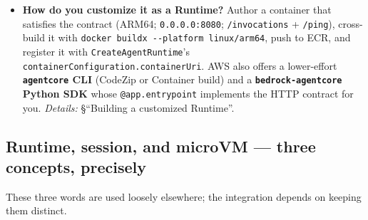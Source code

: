 \documentclass[
  paper=a4,
  ,captions=tableheading
]{scrartcl}
\begin{document}
\begin{itemize}
  and §``Can AgentCore host every frontier sandbox?''.
\item
  \textbf{How do you customize it as a Runtime?} Author a container that
  satisfies the contract (ARM64; \texttt{0.0.0.0:8080};
  \texttt{/invocations} + \texttt{/ping}), cross-build it with
  \texttt{docker\ buildx\ -\/-platform\ linux/arm64}, push to ECR, and
  register it with \texttt{CreateAgentRuntime}'s
  \texttt{containerConfiguration.containerUri}. AWS also offers a
  lower-effort \textbf{\texttt{agentcore} CLI} (CodeZip or Container
  build) and a \textbf{\texttt{bedrock-agentcore} Python SDK} whose
  \texttt{@app.entrypoint} implements the HTTP contract for you.
  \emph{Details:} §``Building a customized Runtime''.
\end{itemize}

\hypertarget{runtime-session-and-microvm-three-concepts-precisely}{%
\subsection{Runtime, session, and microVM --- three concepts,
precisely}\label{runtime-session-and-microvm-three-concepts-precisely}}

These three words are used loosely elsewhere; the integration depends on
keeping them distinct.
\end{document}
